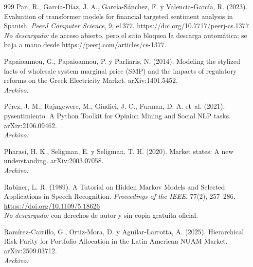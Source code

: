 \begin{thebibliography}{999}
Pan, R., Garc{\'i}a-D{\'i}az, J. A., Garc{\'i}a-S{\'a}nchez, F. y Valencia-Garc{\'i}a, R. (2023). Evaluation of transformer models for financial targeted sentiment analysis in {Spanish}. \emph{PeerJ Computer Science}, 9, e1377. \url{https://doi.org/10.7717/peerj-cs.1377}
\\\textit{No descargado:} de acceso abierto, pero el sitio bloquea la descarga automática; se baja a mano desde \url{https://peerj.com/articles/cs-1377}.

Papaioannou, G., Papaioannou, P. y Parliaris, N. (2014). Modeling the stylized facts of wholesale system marginal price (SMP) and the impacts of regulatory reforms on the Greek Electricity Market. arXiv:1401.5452.
\\\textit{Archivo:} 

P{\'e}rez, J. M., Rajngewerc, M., Giudici, J. C., Furman, D. A. et~al. (2021). pysentimiento: A Python Toolkit for Opinion Mining and Social {NLP} tasks. arXiv:2106.09462.
\\\textit{Archivo:} 

Pharasi, H. K., Seligman, E. y Seligman, T. H. (2020). Market states: A new understanding. arXiv:2003.07058.
\\\textit{Archivo:} 

Rabiner, L. R. (1989). A Tutorial on Hidden {Markov} Models and Selected Applications in Speech Recognition. \emph{Proceedings of the IEEE}, 77(2), 257--286. \url{https://doi.org/10.1109/5.18626}
\\\textit{No descargado:} con derechos de autor y sin copia gratuita oficial.

Ramírez-Carrillo, G., Ortiz-Mora, D. y Aguilar-Larrotta, A. (2025). Hierarchical Risk Parity for Portfolio Allocation in the Latin American NUAM Market. arXiv:2509.03712.
\\\textit{Archivo:} 


\end{thebibliography}
